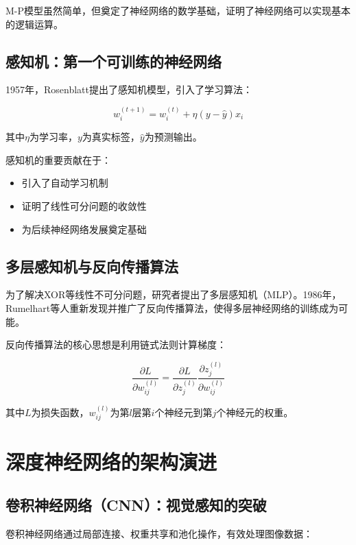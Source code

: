 M-P模型虽然简单，但奠定了神经网络的数学基础，证明了神经网络可以实现基本的逻辑运算。

\subsection{感知机：第一个可训练的神经网络}

1957年，Rosenblatt提出了感知机模型，引入了学习算法：

\begin{equation}
w_{i}^{(t+1)} = w_{i}^{(t)} + \eta (y - \hat{y}) x_i
\end{equation}

其中$\eta$为学习率，$y$为真实标签，$\hat{y}$为预测输出。

感知机的重要贡献在于：
\begin{itemize}
\item 引入了自动学习机制
\item 证明了线性可分问题的收敛性
\item 为后续神经网络发展奠定基础
\end{itemize}

\subsection{多层感知机与反向传播算法}

为了解决XOR等线性不可分问题，研究者提出了多层感知机（MLP）。1986年，Rumelhart等人重新发现并推广了反向传播算法，使得多层神经网络的训练成为可能。

反向传播算法的核心思想是利用链式法则计算梯度：

\begin{equation}
\frac{\partial L}{\partial w_{ij}^{(l)}} = \frac{\partial L}{\partial z_j^{(l)}} \frac{\partial z_j^{(l)}}{\partial w_{ij}^{(l)}}
\end{equation}

其中$L$为损失函数，$w_{ij}^{(l)}$为第$l$层第$i$个神经元到第$j$个神经元的权重。

\section{深度神经网络的架构演进}

\subsection{卷积神经网络（CNN）：视觉感知的突破}

卷积神经网络通过局部连接、权重共享和池化操作，有效处理图像数据：

